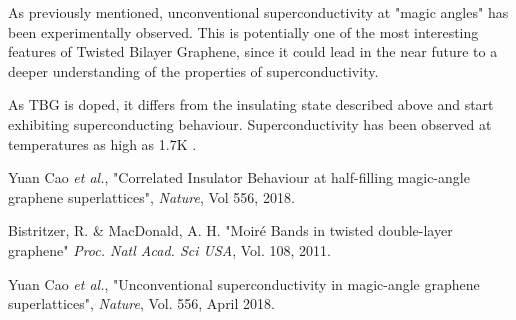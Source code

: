 \documentclass[a4paper,12pt]{report}
\begin{document}
As previously mentioned, unconventional superconductivity at "magic angles" has been experimentally observed. This is potentially one of the most interesting features of Twisted Bilayer Graphene, since it could lead in the near future to a deeper understanding of the properties of superconductivity. 

As TBG is doped, it differs from the insulating state described above and start exhibiting superconducting behaviour. Superconductivity has been observed at temperatures as high as 1.7K \cite{superconductor}. 




\begin{thebibliography}{99}
	
	Yuan Cao \textit{et al.}, "Correlated Insulator Behaviour at half-filling magic-angle graphene superlattices", \textit{Nature}, Vol 556, 2018.
	
	Bistritzer, R. \& MacDonald, A. H. "Moiré Bands in twisted double-layer graphene" \textit{Proc. Natl Acad. Sci USA}, Vol. 108, 2011.
	
	Yuan Cao \textit{et al.}, "Unconventional superconductivity in magic-angle graphene superlattices", \textit{Nature}, Vol. 556, April 2018.
\end{thebibliography}
\end{document}
